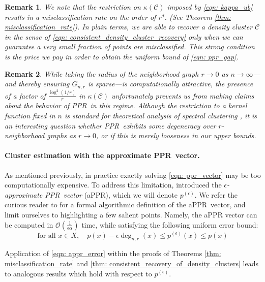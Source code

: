 \documentclass{article}
\newcommand{\1}{\mathbf{1}}
\newcommand{\pbf}{p}        %
\newcommand{\Xbf}{X}             %
\newcommand{\Cset}{\mathcal{C}}
\newcommand{\pprspace}{{\sc PPR~}}
\theoremstyle{aldenthm}
\theoremstyle{aldenrmrk}
\newtheorem{remark}{Remark}
\begin{document}
\begin{remark}
	We note that the restriction on $\kappa(\Cset)$ imposed by \eqref{eqn: kappa_ub} results in a misclassification rate on the order of $r^d$. (See Theorem \ref{thm: misclassification_rate}). In plain terms, we are able to recover a density cluster $\Cset$ in the sense of \eqref{eqn: consistent_density_cluster_recovery} only when we can guarantee a very small fraction of points are misclassified. This strong condition is the price we pay in order to obtain the uniform bound of \ref{eqn: ppr_gap}.
\end{remark}

\begin{remark}
	While taking the radius of the neighborhood graph $r \to 0$ as $n \to \infty$---and thereby ensuring $G_{n,r}$ is sparse---is computationally attractive, the presence of a factor of $\frac{\log^2(1/r)}{r}$ in $\kappa(\Cset)$ unfortunately prevents us from making claims about the behavior of \pprspace in this regime. Although the restriction to a kernel function fixed in $n$ is standard for theoretical analysis of spectral clustering \cite{schiebinger2015,vonluxburg2008}, it is an interesting question whether \pprspace exhibits some degeneracy over $r$-neighborhood graphs as $r \to 0$, or if this is merely looseness in our upper bounds.
\end{remark}

\paragraph{Cluster estimation with the approximate \pprspace vector.}

As mentioned previously, in practice exactly solving \eqref{eqn: ppr_vector} may be too computationally expensive. To address this limitation, \citet{andersen2006} introduced the \emph{$\epsilon$-approximate \pprspace vector} (aPPR), which we will denote $\pbf^{(\epsilon)}$. We refer the curious reader to \cite{andersen2006} for a formal algorithmic definition of the a\pprspace vector, and limit ourselves to highlighting a few salient points. Namely, the aPPR vector can be computed in $\mathcal{O}\left(\frac{1}{\epsilon \alpha}\right)$ time, while satisfying the following uniform error bound:
\begin{equation}
\label{eqn: appr_error}
\textrm{for all $x \in \Xbf$}, \quad \pbf(x) - \epsilon \deg_{n,r}(x)\leq \pbf^{(\epsilon)}(x) \leq \pbf(x)
\end{equation}

Application of \eqref{eqn: appr_error} within the proofs of Theorems \ref{thm: misclassification_rate} and \ref{thm: consistent_recovery_of_density_clusters} leads to analogous results which hold with respect to $\pbf^{(\epsilon)}$.
\end{document}
